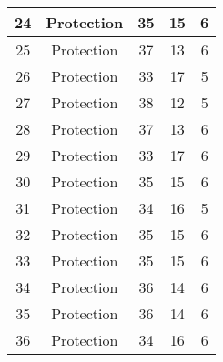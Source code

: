 \documentclass[results.tex]{subfiles}
\begin{document}
\begin{center}
\begin{tabular}{| c || c | c | c | c |}
            \hline
            24                      & Protection                   & 35                     & 15                      & 6                    \\
            \hline
            25                      & Protection                   & 37                     & 13                      & 6                    \\
            \hline
            26                      & Protection                   & 33                     & 17                      & 5                    \\
            \hline
            27                      & Protection                   & 38                     & 12                      & 5                    \\
            \hline
            28                      & Protection                   & 37                     & 13                      & 6                    \\
            \hline
            29                      & Protection                   & 33                     & 17                      & 6                    \\
            \hline
            30                      & Protection                   & 35                     & 15                      & 6                    \\
            \hline
            31                      & Protection                   & 34                     & 16                      & 5                    \\
            \hline
            32                      & Protection                   & 35                     & 15                      & 6                    \\
            \hline
            33                      & Protection                   & 35                     & 15                      & 6                    \\
            \hline
            34                      & Protection                   & 36                     & 14                      & 6                    \\
            \hline
            35                      & Protection                   & 36                     & 14                      & 6                    \\
            \hline
            36                      & Protection                   & 34                     & 16                      & 6                    \\

\end{tabular}
\end{center}
\end{document}
